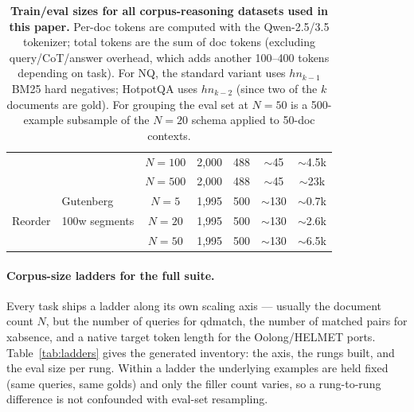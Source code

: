 \begin{table}[h]
\begin{tabular}{l l c c c c c}
                               &                 & $N{=}100$ & 2{,}000 & 488 & $\sim$45  & $\sim$4.5k \\
                               &                 & $N{=}500$ & 2{,}000 & 488 & $\sim$45  & $\sim$23k  \\
\midrule
\multirow{3}{*}{Reorder}       & Gutenberg       & $N{=}5$   & 1{,}995 & 500 & $\sim$130 & $\sim$0.7k \\
                               & 100w segments   & $N{=}20$  & 1{,}995 & 500 & $\sim$130 & $\sim$2.6k \\
                               &                 & $N{=}50$  & 1{,}995 & 500 & $\sim$130 & $\sim$6.5k \\
\bottomrule
\end{tabular}
\caption{\textbf{Train/eval sizes for all corpus-reasoning datasets used in this paper.} Per-doc tokens are computed with the Qwen-2.5/3.5 tokenizer; total tokens are the sum of doc tokens (excluding query/CoT/answer overhead, which adds another 100--400 tokens depending on task). For NQ, the standard variant uses $hn_{k-1}$ BM25 hard negatives; HotpotQA uses $hn_{k-2}$ (since two of the $k$ documents are gold). For grouping the eval set at $N{=}50$ is a 500-example subsample of the $N{=}20$ schema applied to 50-doc contexts.}
\label{tab:data-stats}
\end{table}

\paragraph{Corpus-size ladders for the full suite.}

Every task ships a ladder along its own scaling axis --- usually the document count $N$, but the
number of queries for qdmatch, the number of matched pairs for xabsence, and a native target token
length for the Oolong/HELMET ports. Table~\ref{tab:ladders} gives the generated inventory: the axis,
the rungs built, and the eval size per rung. Within a ladder the underlying examples are held fixed
(same queries, same golds) and only the filler count varies, so a rung-to-rung difference is not
confounded with eval-set resampling.

